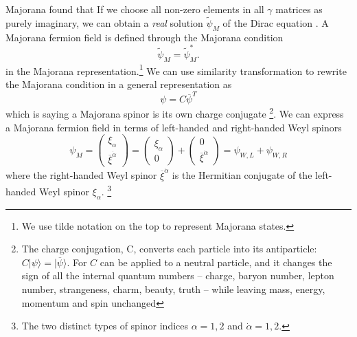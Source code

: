 \documentclass[12pt]{report}
\begin{document}
Majorana found that If we choose all non-zero elements in all $\gamma$ matrices as purely imaginary, we can obtain a \textit{real} solution $\widetilde{\psi}_{M}$ of the Dirac equation \cite{majorana}.
A Majorana fermion field is defined through the Majorana condition
\begin{equation}
\widetilde{\psi}_{M} = \widetilde{\psi}^{*}_{M} .
\end{equation}
in the Majorana representation.\footnote{We use tilde notation on the top to represent Majorana states.}
We can use similarity transformation to rewrite the Majorana condition in a general representation as
\begin{equation}
\psi = C \overline{\psi}^{T}
\end{equation}
which is saying a Majorana spinor is its own charge conjugate \footnote{The charge conjugation, C, converts each particle into its antiparticle: $C| \psi \rangle = | \overline{\psi} \rangle$. For $C$ can be applied to a neutral particle, and it changes the sign of all the internal quantum numbers -- charge, baryon number, lepton number, strangeness, charm, beauty, truth -- while leaving mass, energy, momentum and spin unchanged}.
We can express a Majorana fermion field in terms of left-handed and right-handed Weyl spinors
\begin{equation}
\psi_{M} = \left( \begin{array}{c} \xi_{\alpha}\\ \overline{\xi}^{\dot{\alpha}} \end{array} \right) = \left( \begin{array}{c} \xi_{\alpha}\\0\end{array} \right) + \left( \begin{array}{c}0\\ \overline{\xi}^{\dot{\alpha}} \end{array} \right) = \psi_{W, L} + \psi_{W, R}
\end{equation}
where the right-handed Weyl spinor $\overline{\xi}^{\dot{\alpha}}$ is the Hermitian conjugate of the left-handed Weyl spinor $\xi_{\alpha}$. \footnote{The two distinct types of spinor indices $\alpha = 1, 2$ and $\dot{\alpha} = 1, 2$.}
\end{document}
